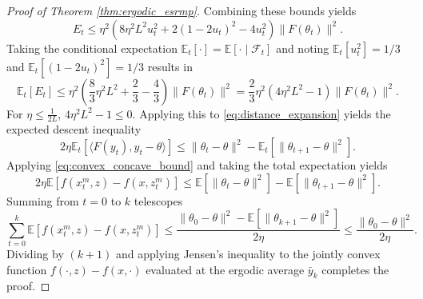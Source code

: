 \documentclass[letter,11pt]{article}
\begin{document}
\begin{proof}[Proof of Theorem \ref{thm:ergodic_esrmp}]
Combining these bounds yields
\begin{equation} \label{eq:error_total_unconditioned}
E_t \le \eta^2 \left( 8\eta^2 L^2 u_t^2 + 2(1-2u_t)^2 - 4u_t^2 \right) \|F(\theta_t)\|^2.
\end{equation}
Taking the conditional expectation $\mathbb{E}_t[\cdot] = \mathbb{E}[\cdot \mid \mathcal{F}_t]$ and noting $\mathbb{E}_t[u_t^2] = 1/3$ and $\mathbb{E}_t[(1-2u_t)^2] = 1/3$ results in
\begin{equation} \label{eq:error_expectation_collapsed}
\mathbb{E}_t[E_t] \le \eta^2 \left( \frac{8}{3}\eta^2 L^2 + \frac{2}{3} - \frac{4}{3} \right) \|F(\theta_t)\|^2 = \frac{2}{3}\eta^2 \left( 4\eta^2 L^2 - 1 \right) \|F(\theta_t)\|^2.
\end{equation}
For $\eta \le \frac{1}{2L}$, $4\eta^2 L^2 - 1 \le 0$. Applying this to \eqref{eq:distance_expansion} yields the expected descent inequality
\begin{equation} \label{eq:fundamental_descent_expectation}
2\eta \mathbb{E}_t \left[ \langle F(y_t), y_t - \theta \rangle \right] \le \|\theta_t - \theta\|^2 - \mathbb{E}_t \left[ \|\theta_{t+1} - \theta\|^2 \right].
\end{equation}
Applying \eqref{eq:convex_concave_bound} and taking the total expectation yields
\begin{equation}
2\eta \mathbb{E} \left[ f(x_t^m, z) - f(x, z_t^m) \right] \le \mathbb{E} \left[ \|\theta_t - \theta\|^2 \right] - \mathbb{E} \left[ \|\theta_{t+1} - \theta\|^2 \right].
\end{equation}
Summing from $t=0$ to $k$ telescopes
\begin{equation} \label{eq:telescopic_sum}
\sum_{t=0}^k \mathbb{E} \left[ f(x_t^m, z) - f(x, z_t^m) \right] \le \frac{\|\theta_0 - \theta\|^2 - \mathbb{E} \left[ \|\theta_{k+1} - \theta\|^2 \right]}{2\eta} \le \frac{\|\theta_0 - \theta\|^2}{2\eta}.
\end{equation}
Dividing by $(k+1)$ and applying Jensen's inequality to the jointly convex function $f(\cdot, z) - f(x, \cdot)$ evaluated at the ergodic average $\bar{y}_k$ completes the proof.
\end{proof}
\end{document}

